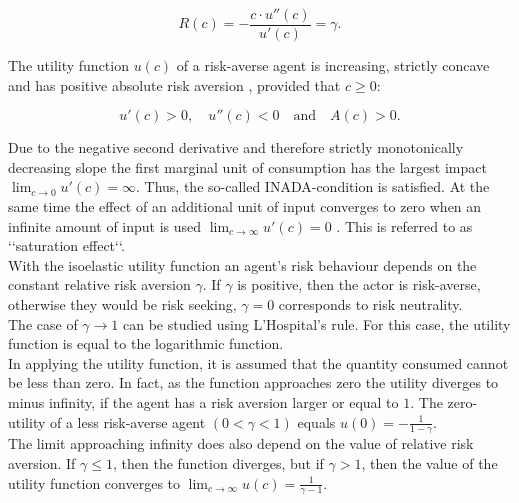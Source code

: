\bigskip

\begin{equation}
    R(c) = - \dfrac{c \cdot u''(c)}{u'(c)} = \gamma.
\end{equation}

\bigskip

\noindent The utility function $u(c)$ of a risk-averse agent is increasing, strictly concave and has positive absolute risk aversion \citep[p. 2]{poon2018finance}, provided that $c \geq 0$:

\begin{equation}\label{eq:ut.func.derivatives}
    u'(c) > 0, \quad u''(c) < 0 \quad \text{and} \quad A(c) > 0.
\end{equation}

\bigskip

\noindent Due to the negative second derivative and therefore strictly monotonically decreasing slope the first marginal unit of consumption has the largest impact $\lim_{c \to 0} u'(c) = \infty$. Thus, the so-called INADA-condition is satisfied. At the same time the effect of an additional unit of input converges to zero when an infinite amount of input is used $\lim_{c \to \infty} u'(c) = 0$ \citep[p. 20]{Uzawa1971sectormodel}. This is referred to as \lq\lq saturation effect\lq\lq. \label{INADA}\\

\noindent With the isoelastic utility function an agent's risk behaviour depends on the constant relative risk aversion $\gamma$. If $\gamma$ is positive, then the actor is risk-averse, otherwise they would be risk seeking, $\gamma = 0$ corresponds to risk neutrality.\\

\noindent The case of $\gamma \rightarrow 1$ can be studied using L'Hospital's rule. For this case, the utility function is equal to the logarithmic function.\\

\noindent In applying the utility function, it is assumed that the quantity consumed cannot be less than zero. In fact, as the function approaches zero the utility diverges to minus infinity, if the agent has a risk aversion larger or equal to $1$. The zero-utility of a less risk-averse agent $(0 < \gamma<1)$ equals $u(0) = -\frac{1}{1-\gamma}$. \\
The limit approaching infinity does also depend on the value of relative risk aversion. If $\gamma \leq 1$, then the function diverges, but if $\gamma > 1$, then the value of the utility function converges to 
$\lim_{c \to \infty} u(c) = \frac{1}{\gamma -1}$. \label{isoel.ut.f:limits}
